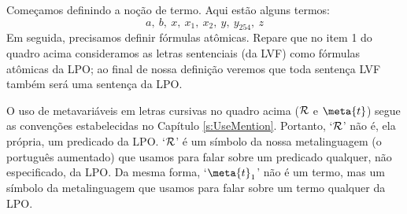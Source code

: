 Começamos definindo a noção de termo.
Aqui estão alguns termos:
	$$a, \ b, \ x, \ x_1, \ x_2, \ y, \ y_{254}, \ z$$
Em seguida, precisamos definir fórmulas atômicas.
Repare que no item 1 do quadro acima consideramos as letras sentenciais (da LVF) como fórmulas atômicas da LPO; ao final de nossa definição veremos que toda sentença LVF também será uma sentença da LPO.

O uso de metavariáveis em letras cursivas no quadro acima ($\mathcal{R}$ e $\meta{t}$) segue as convenções estabelecidas no Capítulo \ref{s:UseMention}.
Portanto, `$\mathcal{R}$' não é, ela própria, um predicado da LPO.
`$\mathcal{R}$' é um símbolo da nossa metalinguagem (o português aumentado) que usamos para falar sobre um predicado qualquer, não especificado, da LPO.
Da mesma forma, `$\meta{t}_1$' não é um termo, mas um símbolo da metalinguagem que usamos para falar sobre um termo qualquer da LPO.

